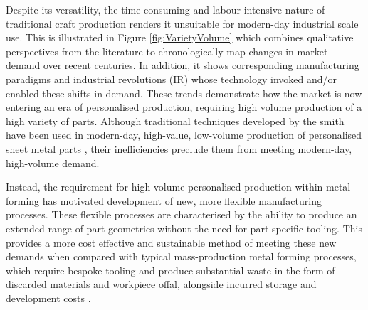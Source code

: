 Despite its versatility, the time-consuming and labour-intensive nature of traditional craft production renders it unsuitable for modern-day industrial scale use. This is illustrated in Figure \ref{fig:VarietyVolume} which combines qualitative perspectives from the literature \citep{Koren2010TheRevolution,Popkova2019FundamentalRevolutions,Mourtzis2012DecentralizedOutlook,Mourtzis2014TheCustomisation} to chronologically map changes in market demand over recent centuries. In addition, it shows corresponding manufacturing paradigms and industrial revolutions (IR) whose technology invoked  and/or enabled these shifts in demand. These trends demonstrate how the market is now entering an era of personalised production, requiring high volume production of a high variety of parts. Although traditional techniques developed by the smith have been used in modern-day, high-value, low-volume production of personalised sheet metal parts \citep{Amos2015Bloodhoundfeathers}, their inefficiencies preclude them from meeting modern-day, high-volume demand.

Instead, the requirement for high-volume personalised production within metal forming has motivated development of new, more flexible manufacturing processes. These flexible processes are characterised by the ability to produce an extended range of part geometries without the need for part-specific tooling. This provides a more cost effective and sustainable method of meeting these new demands when compared with typical mass-production metal forming processes, which require bespoke tooling and produce substantial waste in the form of discarded materials and workpiece offal, alongside incurred storage and development costs \citep{Cooper2017TheProcesses,Horton2019ImplementingComponents}. 


